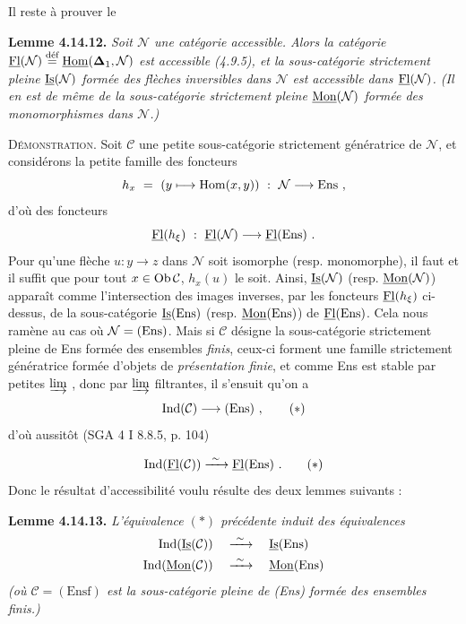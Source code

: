 Il reste à prouver le

\textbf{Lemme 4.14.12.} \textit{Soit $\mathcal{N}$ une catégorie accessible. Alors la catégorie $\uFl(\mathcal{N}) \defeq \uHom(\boldsymbol{\Delta}_1,\mathcal{N})$ est accessible (4.9.5), et la sous-catégorie strictement pleine $\uIs(\mathcal{N})$ formée des flèches inversibles dans $\mathcal{N}$ est accessible dans $\uFl(\mathcal{N})$. (Il en est de même de la sous-catégorie strictement pleine $\uMon(\mathcal{N})$ formée des monomorphismes dans $\mathcal{N}$.)}

\textsc{Démonstration}. Soit $\mathcal{C}$ une petite sous-catégorie strictement génératrice de $\mathcal{N}$, et considérons la petite famille des foncteurs
\[
h_x \ = \ (y \longmapsto \mathrm{Hom}(x,y)) \ : \ \mathcal{N} \longrightarrow \Ens \ ,
\]
d'où des foncteurs
\[
\uFl(h_\xi) \ : \ \uFl(\mathcal{N}) \longrightarrow \uFl(\Ens) \ . %
\]
Pour qu'une flèche $u : y \longrightarrow z$ dans $\mathcal{N}$ soit isomorphe (resp. monomorphe), il faut et il suffit que pour tout $x \in \Ob\mathcal{C}$, $h_x(u)$ le soit. Ainsi, $\uIs(\mathcal{N})$ (resp. $\uMon(\mathcal{N})$) apparaît comme l'intersection des images inverses, par les foncteurs $\uFl(h_\xi)$ ci-dessus, de la sous-catégorie $\uIs(\Ens)$ (resp. $\uMon(\Ens)$) de $\uFl(\Ens)$. Cela nous ramène au cas où $\mathcal{N} = (\Ens)$. Mais si $\mathcal{C}$ désigne la sous-catégorie strictement pleine de Ens formée des ensembles \textit{finis}, ceux-ci forment une famille strictement génératrice formée d'objets de \textit{présentation finie}, et comme Ens est stable par petites $\varinjlim$ , donc par $\varinjlim$ filtrantes, il s'ensuit qu'on a %
\[
\Ind(\mathcal{C}) \longrightarrow (\Ens) \ , \tag*{$(*)$}
\]
d'où aussitôt (SGA 4 I 8.8.5, p. 104)

\[
\Ind(\uFl(\mathcal{C})) \xrightarrow{\ \sim\ } \uFl(\Ens) \ . \tag*{$(*)$}
\]
Donc le résultat d'accessibilité voulu résulte des deux lemmes suivants :

\textbf{Lemme 4.14.13.} \textit{L'équivalence $(*)$ précédente induit des équivalences}
\[
\begin{aligned}
\Ind(\uIs(\mathcal{C})) \quad &\xrightarrow{\ \sim\ } \quad \uIs(\Ens) \\
\Ind(\uMon(\mathcal{C})) \quad &\xrightarrow{\ \sim\ } \quad \uMon(\Ens)
\end{aligned}
\]
\textit{(où $\mathcal{C} = (\mathrm{Ensf})$ est la sous-catégorie pleine de \textup{(Ens)} formée des ensembles \textup{finis}.)}

